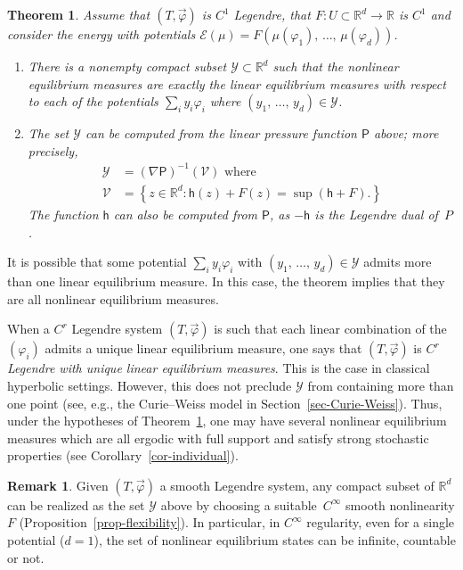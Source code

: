 \documentclass[10pt]{amsart}
\theoremstyle{definition}\newtheorem{defi}[theo]{Definition}\newtheorem{rema}[theo]{Remark}\newtheorem{exam}[theo]{Example}\newtheorem{exem}[theo]{Example}\newtheorem{nota}[theo]{Notation}
\theoremstyle{plain}
\newtheorem{theol}{Theorem}
\theoremstyle{plain}
\newcommand\vpot{\vec\pot}
\newcommand{\hf}{\mathsf{h}}
\newcommand{\Pf}{\mathsf{P}}
\newcommand{\pot}{\varphi}
\newcounter{In}
\newcommand*\8{\infty}
\newcommand\RR{\mathbb{R}}
\newcommand{\En}{\mathcal{E}}
\newcommand{\scY}{\mathscr{Y}}
\newcommand{\scV}{\mathscr{V}}
\newcommand*{\romanenumi}{\renewcommand*{\theenumi}{\roman{enumi}}}
\begin{document}
\begin{theol}\label{thm-equilibria}
Assume that $(T,\vec\pot)$ is $C^{ 1}$ Legendre, that $F:U\subset\RR^d\to\RR$ is $C^{ 1}$ and consider the energy with potentials $\En(\mu) = F(\mu(\pot_1),\,\dots,\,\mu(\pot_d))$.
\begin{enumerate}\romanenumi
\item There is a nonempty compact subset $\scY\subset\RR^d$ such that the nonlinear equilibrium measures are exactly the \emph{linear} equilibrium measures with respect to each of the potentials $\sum_i y_i\pot_i$ where $(y_1,\,\dots,\,y_d)\in\scY$.

\item The set $\scY$ can be computed from the linear pressure function $\Pf$ above; more precisely,
\begin{align*}
\scY&=(\nabla \Pf)^{-1}(\scV) \text{ where }\\
\scV &=\left\{z\in\RR^d \colon \hf(z)+F(z)=\sup(\hf + F). \right\}
\end{align*}
The function $\hf$ can also be computed from $\Pf$, as $-\hf$ is the Legendre dual of~$P$.
\end{enumerate}
\end{theol}

It is possible that some potential $\sum_i y_i\pot_i$ with $(y_1,\,\dots,\,y_d)\in\scY$ admits more than one linear equilibrium measure. In this case, the theorem implies that they are all nonlinear equilibrium measures.


When a $C^r$ Legendre system $(T,\vec\pot)$ is such that each linear combination of the $(\pot_i)$ admits a unique linear equilibrium measure, one says that $(T,\vec\pot)$ is \emph{$C^r$ Legendre with unique linear equilibrium measures}. This is the case in classical hyperbolic settings. However, this does not preclude $\scY$ from containing more than one point (see, e.g., the Curie--Weiss model in Section~\ref{sec-Curie-Weiss}). Thus, under the hypotheses of Theorem~\ref{thm-equilibria}, one may have several nonlinear equilibrium measures which are all ergodic with full support and satisfy strong stochastic properties (see Corollary~\ref{cor-individual}).


\begin{rema}
Given $(T,\vpot)$ a smooth Legendre system, any compact subset of $\RR^d$ can be realized as the set $\scY$ above by choosing a suitable~$C^\infty$ smooth nonlinearity $F$ (Proposition~\ref{prop-flexibility}). In particular, in $C^\infty$ regularity, even for a single potential ($d=1$), the set of nonlinear equilibrium states can be infinite, countable or not.
\end{rema}
\end{document}
